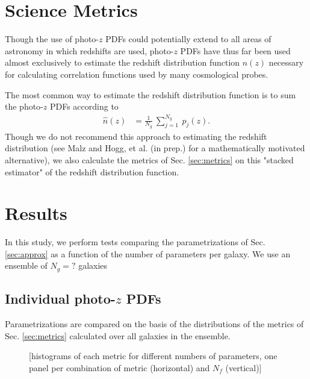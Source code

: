 \documentclass[\docopts]{\docclass}
\newcommand{\pz}{photo-$z$ PDF}
\begin{document}
\section{Science Metrics}
\label{sec:science}

Though the use of \pz s could potentially extend to all areas of astronomy in 
which redshifts are used, \pz s have thus far been used almost exclusively to 
estimate the redshift distribution function $n(z)$ necessary for calculating 
correlation functions used by many cosmological probes.


The most common way to estimate the redshift distribution function is to sum 
the \pz s according to
\begin{align}
  \label{eq:nz}
  \hat{n}(z) &= \frac{1}{N_{g}}\ \sum_{j=1}^{N_{g}}\ p_{j}(z).
\end{align}
Though we do not recommend this approach to estimating the redshift 
distribution (see Malz and Hogg, et al. (in prep.) for a mathematically 
motivated alternative), we also calculate the metrics of Sec. \ref{sec:metrics} 
on this "stacked estimator" of the redshift distribution function.






\section{Results}
\label{sec:results}



In this study, we perform tests comparing the parametrizations of Sec. 
\ref{sec:approx} as a function of the number of parameters per galaxy.  We use 
an ensemble of $N_{g}=?$ galaxies

\subsection{Individual \pz s}
\label{sec:individual}

Parametrizations are compared on the basis of the distributions of the metrics 
of Sec. \ref{sec:metrics} calculated over all galaxies in the ensemble.

\begin{figure}
  \caption{[histograms of each metric for different numbers of parameters, one 
panel per combination of metric (horizontal) and $N_{f}$ (vertical)]
  \label{fig:individual}}
\end{figure}
\end{document}
